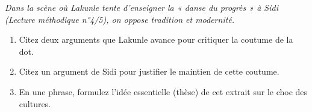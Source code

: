 \documentclass[11pt]{article}
\begin{document}
\begin{exercice}
\emph{Dans la scène où Lakunle tente d'enseigner la « danse du progrès » à Sidi (Lecture méthodique n°4/5), on oppose tradition et modernité.}
\begin{enumerate}
    \item Citez deux arguments que Lakunle avance pour critiquer la coutume de la dot.
    \item Citez un argument de Sidi pour justifier le maintien de cette coutume.
    \item En une phrase, formulez l'idée essentielle (thèse) de cet extrait sur le choc des cultures.
\end{enumerate}
\end{exercice}
\end{document}
